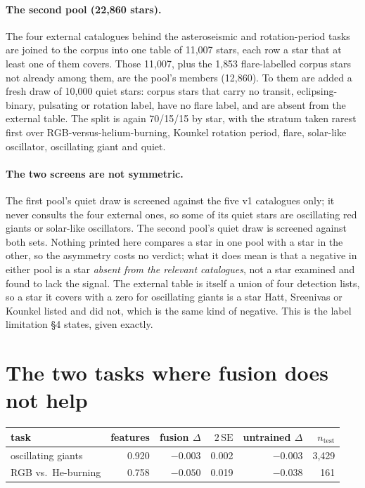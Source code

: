 \documentclass{article}
\begin{document}
\paragraph{The second pool (22{,}860 stars).} The four external catalogues behind the asteroseismic
and rotation-period tasks are joined to the corpus into one table of 11{,}007 stars, each row a star
that at least one of them covers. Those 11{,}007, plus the 1{,}853 flare-labelled corpus stars not
already among them, are the pool's members (12{,}860). To them are added a fresh draw of 10{,}000
quiet stars: corpus stars that carry no transit, eclipsing-binary, pulsating or rotation label, have
no flare label, and are absent from the external table. The split is again 70/15/15 by star, with the
stratum taken rarest first over RGB-versus-helium-burning, Kounkel rotation period, flare, solar-like
oscillator, oscillating giant and quiet.

\paragraph{The two screens are not symmetric.} The first pool's quiet draw is screened against the
five v1 catalogues only; it never consults the four external ones, so some of its quiet stars are
oscillating red giants or solar-like oscillators. The second pool's quiet draw is screened against
both sets. Nothing printed here compares a star in one pool with a star in the other, so the
asymmetry costs no verdict; what it does mean is that a negative in either pool is a star
\emph{absent from the relevant catalogues}, not a star examined and found to lack the signal. The
external table is itself a union of four detection lists, so a star it covers with a zero for
oscillating giants is a star Hatt, Sreenivas or Kounkel listed and \citet{hon2021} did not, which is
the same kind of negative. This is the label limitation \S4 states, given exactly.

\section{The two tasks where fusion does not help}
\label{app:negatives}

\begin{center}
\small
\begin{tabular}{lrrrrr}
\toprule
task & features & fusion $\Delta$ & $2\,\mathrm{SE}$ & untrained $\Delta$ & $n_{\mathrm{test}}$ \\
\midrule
oscillating giants & 0.920 & $-0.003$ & 0.002 & $-0.003$ & 3{,}429 \\
RGB vs.\ He-burning & 0.758 & $-0.050$ & 0.019 & $-0.038$ & 161 \\
\bottomrule
\end{tabular}
\end{center}
\end{document}
